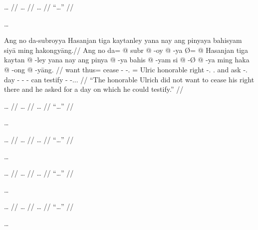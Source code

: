 \documentclass[12pt,paper=a4]{scrartcl}
\begin{document}
\ex \begingl
	\glpreamble … //
	\gla … //
	\glb … //
	\glft \enquote{…} //
\endgl \xe

…


\ex \begingl
	\glpreamble Ang no da-subroyya Hasanjan tiga kaytanley yana nay 
		ang pinyaya bahisyam siyā ming ha\-kong\-yāng.//
	\gla Ang no da= @ subr @ -oy @ -ya Ø= @ Hasanjan tiga kaytan @ -ley yana 
		nay ang pinya @ -ya bahis @ -yam si @ -Ø @ -ya ming haka @ -ong @ 
		-yāng. //
	\glb \AgtT{} want thus= cease -\Neg{} -\Tsg{}.\M{} \Top{}= Ulric 
		honorable right -\Parg{}.\Inan{} \Tsg{}.\Gen{} and \AgtT{} ask 
		-\Tsg{}.\M{} day -\Dat{} \Rel{} -\Dat{} -\Loc{} can testify 
		-\Irr{} -\Tsg{}.\M{}.\Aarg{}. //
	\glft \enquote{The honorable Ulrich did not want to cease his right 
		there and he asked for a day on which he could testify.} //
\endgl \xe


\ex \begingl
	\glpreamble … //
	\gla … //
	\glb … //
	\glft \enquote{…} //
\endgl \xe

…


\ex \begingl
	\glpreamble … //
	\gla … //
	\glb … //
	\glft \enquote{…} //
\endgl \xe

…


\ex \begingl
	\glpreamble … //
	\gla … //
	\glb … //
	\glft \enquote{…} //
\endgl \xe

…


\ex \begingl
	\glpreamble … //
	\gla … //
	\glb … //
	\glft \enquote{…} //
\endgl \xe

…

\end{document}
